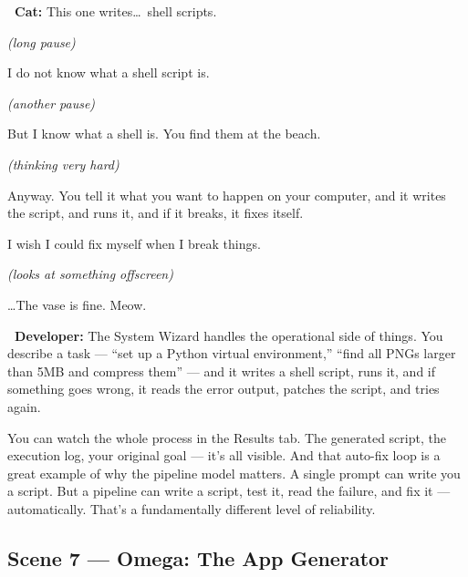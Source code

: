 \documentclass[12pt, letterpaper]{article}
\newcommand{\dev}{\textbf{\color{cogblue}\faIcon{laptop-code}\ Developer:}}
\newcommand{\cat}{\textbf{\color{catpink}\faIcon{cat}\ Cat:}}
\begin{document}
  \begin{catbox}
    \cat{} \large This one writes\ldots\ shell scripts.

    \medskip
    {\large\textit{(long pause)}}

    \medskip
    {\large I do not know what a shell script is.}

    \medskip
    {\large\textit{(another pause)}}

    \medskip
    {\large But I know what a shell is. You find them at the beach.}

    \medskip
    {\large\textit{(thinking very hard)}}

    \medskip
    {\large Anyway. You tell it what you want to happen on your computer, and it
    writes the script, and runs it, and if it breaks, it fixes itself.}

    \medskip
    {\large I wish I could fix myself when I break things.}

    \medskip
    {\large\textit{(looks at something offscreen)}}

    \medskip
    {\large \ldots The vase is fine. Meow.}
  \end{catbox}

  \begin{developerbox}
    \dev{} The System Wizard handles the operational side of things. You describe a
    task — ``set up a Python virtual environment,'' ``find all PNGs larger than 5MB
    and compress them'' — and it writes a shell script, runs it, and if something
    goes wrong, it reads the error output, patches the script, and tries again.

    \medskip
    You can watch the whole process in the Results tab. The generated script, the
    execution log, your original goal — it's all visible. And that auto-fix loop is
    a great example of why the pipeline model matters. A single prompt can write
    you a script. But a pipeline can write a script, test it, read the failure, and
    fix it — automatically. That's a fundamentally different level of reliability.
  \end{developerbox}

  \subsection{Scene 7 — Omega: The App Generator}
\end{document}
